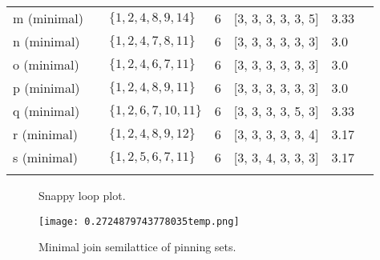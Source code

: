 \documentclass{article}%
\begin{document}
\begin{table}[ht]
\begin{tabularx}{\textwidth}{lXXXXXX}
			m (minimal) & {\Huge\textcolor{green12}{\textbullet}} & $\{1,2,4,8,9,14\}$ & 6 & [3, 3, 3, 3, 3, 5] & 3.33 \\
			n (minimal) & {\Huge\textcolor{green13}{\textbullet}} & $\{1,2,4,7,8,11\}$ & 6 & [3, 3, 3, 3, 3, 3] & 3.0 \\
			o (minimal) & {\Huge\textcolor{green14}{\textbullet}} & $\{1,2,4,6,7,11\}$ & 6 & [3, 3, 3, 3, 3, 3] & 3.0 \\
			p (minimal) & {\Huge\textcolor{green15}{\textbullet}} & $\{1,2,4,8,9,11\}$ & 6 & [3, 3, 3, 3, 3, 3] & 3.0 \\
			q (minimal) & {\Huge\textcolor{green16}{\textbullet}} & $\{1,2,6,7,10,11\}$ & 6 & [3, 3, 3, 3, 5, 3] & 3.33 \\
			r (minimal) & {\Huge\textcolor{green17}{\textbullet}} & $\{1,2,4,8,9,12\}$ & 6 & [3, 3, 3, 3, 3, 4] & 3.17 \\
			s (minimal) & {\Huge\textcolor{green18}{\textbullet}} & $\{1,2,5,6,7,11\}$ & 6 & [3, 3, 4, 3, 3, 3] & 3.17 \\
		\bottomrule \\ 
	\end{tabularx}
\end{table}

\newpage

\begin{multicols}{2}
\begin{figure}[H]
\centering

\caption{Snappy loop plot.}
\label{fig:0.8458595401918743temp.svg}
\end{figure}
\columnbreak

\begin{figure}[H]
\centering
\texttt{[image: 0.2724879743778035temp.png]}
\caption{Minimal join semilattice of pinning sets.}
\label{fig:0.2724879743778035temp.png}
\end{figure}
\end{multicols}

\newpage
\end{document}
